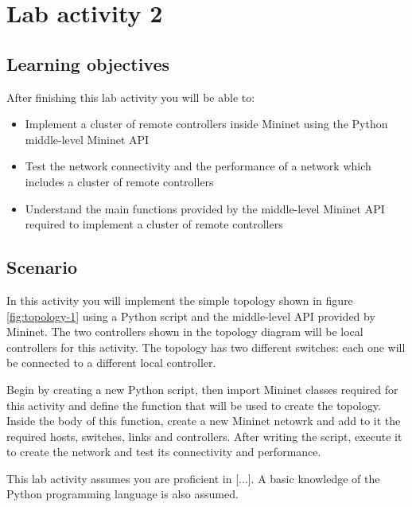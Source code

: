 \section*{Lab activity 2}

\subsection*{Learning objectives}
After finishing this lab activity you will be able to:
\begin{itemize}
  \item Implement a cluster of remote controllers inside Mininet using the Python
  middle-level Mininet API
  \item Test the network connectivity and the performance of a network which
  includes a cluster of remote controllers
  \item Understand the main functions provided by the middle-level Mininet API required
  to implement a cluster of remote controllers
\end{itemize}






\subsection*{Scenario}
In this activity you will implement the simple topology shown in figure \ref{fig:topology-1} using
a Python script and the middle-level API provided by Mininet. The two controllers
shown in the topology diagram will be local controllers for this activity.
The topology has two different switches: each one will be connected to a different
local controller.

Begin by creating a new Python script, then import Mininet classes required for
this activity and define the function that will be used to create the topology.
Inside the body of this function, create a new Mininet netowrk and add to it the
required hosts, switches, links and controllers. After writing the script, execute
it to create the network and test its connectivity and performance.

This lab activity assumes you are proficient in [...]. A basic knowledge of the
Python programming language is also assumed.
